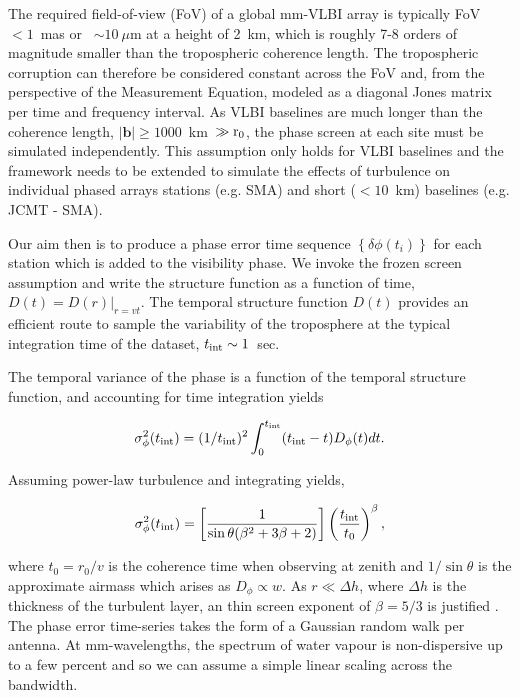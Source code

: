 The required field-of-view (FoV) of a global mm-VLBI array is typically FoV~$< 1$~mas or ~$\sim10~\mu$m at a height of 2~km, which is roughly 7-8 orders of magnitude smaller than the tropospheric coherence length. The tropospheric corruption can therefore be considered constant across the FoV and, from the perspective of the Measurement Equation, modeled as a diagonal Jones matrix per time and frequency interval. As VLBI baselines are much longer than the coherence length, $|\bm{b}| \ge 1000$~km~$\gg \rm r_0$, the phase screen at each site must be simulated independently. This assumption only holds for VLBI baselines and the framework needs to be extended to simulate the effects of turbulence on individual phased arrays stations (e.g. SMA) and short ($<10$~km) baselines (e.g. JCMT - SMA). 

Our aim then is to produce a phase error time sequence $\left\{\delta \phi(t_i)\right\}$ for each station which is added to the visibility phase. We invoke the frozen screen assumption and write the structure function as a function of time, ${D (t) =  D(r)|_{r=vt}}$. The temporal structure function $D(t)$ provides an efficient route to sample the variability of the troposphere at the typical integration time of the dataset, $t_{\rm int} \sim 1$~sec. 

The temporal variance of the phase is a function of the temporal structure function, and accounting for time integration yields \citep*[see][B3]{Treuhaft_1987} 

\begin{equation}
\sigma^2_{\phi}(t_{\rm int}) = (1/t_{\rm int})^2 \int_{0}^{t_{\rm int}} (t_{\rm int}-t) D_{\phi}(t) dt.
\end{equation}

Assuming power-law turbulence and integrating yields, 

\begin{equation}\label{eq:turb_final}
\sigma^2_\phi (t_{\rm int})=\left[\frac{1}{\sin\theta(\beta^2 +3\beta +2)}\right]\left(\frac{t_{\rm int}}{t_0}\right)^{\beta},
\end{equation}


\noindent where $t_0 = r_0/v$ is the coherence time when observing at zenith and $1/\sin\theta$ is the approximate airmass which arises as $D_\phi \propto w$. As $r \ll \Delta h$, where $\Delta h$ is the thickness of the turbulent layer, an thin screen exponent of $\beta = 5/3$ is justified \citep*{Treuhaft_1987}. The phase error time-series takes the form of a Gaussian random walk per antenna. At mm-wavelengths, the spectrum of water vapour is non-dispersive up to a few percent \citep{Curtis_2009} and so we can assume a simple linear scaling across the bandwidth.






